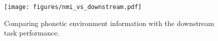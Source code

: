 \begin{figure}[t!]
    \centering
    \texttt{[image: figures/nmi\_vs\_downstream.pdf]}
    \caption{
        Comparing phonetic environment information with the downstream task performance.
    }
    \label{fig:nmi_vs_downstream}
\end{figure}
